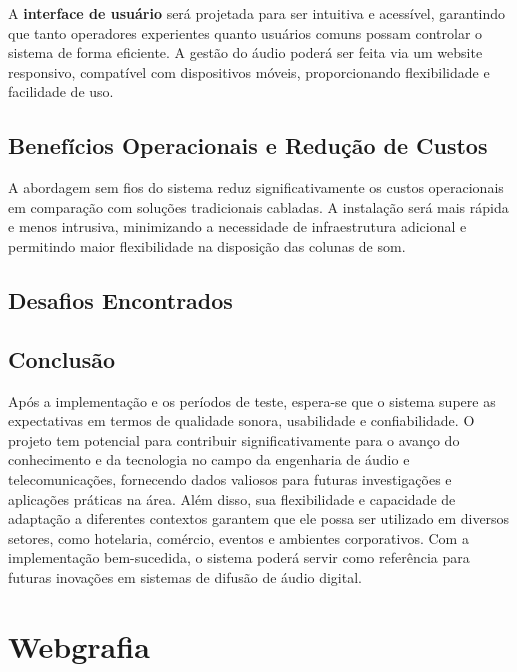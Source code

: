 \documentclass{article}
\begin{document}
A \textbf{interface de usuário} será projetada para ser intuitiva e acessível, garantindo que tanto operadores experientes quanto usuários comuns possam controlar o sistema de forma eficiente. A gestão do áudio poderá ser feita via um website responsivo, compatível com dispositivos móveis, proporcionando flexibilidade e facilidade de uso.

\hspace{2cm}

\subsection{Benefícios Operacionais e Redução de Custos}
A abordagem sem fios do sistema reduz significativamente os custos operacionais em comparação com soluções tradicionais cabladas. A instalação será mais rápida e menos intrusiva, minimizando a necessidade de infraestrutura adicional e permitindo maior flexibilidade na disposição das colunas de som.

\hspace{2cm}
\newpage

\subsection{Desafios Encontrados}


\subsection{Conclusão}
Após a implementação e os períodos de teste, espera-se que o sistema supere as expectativas em termos de qualidade sonora, usabilidade e confiabilidade. O projeto tem potencial para contribuir significativamente para o avanço do conhecimento e da tecnologia no campo da engenharia de áudio e telecomunicações, fornecendo dados valiosos para futuras investigações e aplicações práticas na área. Além disso, sua flexibilidade e capacidade de adaptação a diferentes contextos garantem que ele possa ser utilizado em diversos setores, como hotelaria, comércio, eventos e ambientes corporativos. Com a implementação bem-sucedida, o sistema poderá servir como referência para futuras inovações em sistemas de difusão de áudio digital.


\newpage


\section*{Webgrafia}
\end{document}
